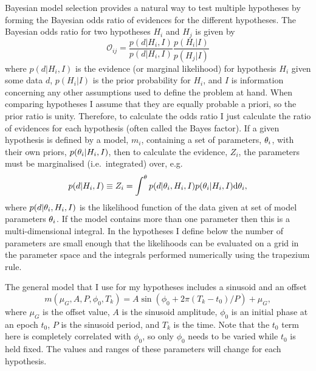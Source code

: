 \documentclass[comment]{epl2}
\begin{document}
Bayesian model selection provides a natural way to test multiple hypotheses by forming the Bayesian odds ratio of
evidences for the different hypotheses. The Bayesian odds ratio for two hypotheses $H_i$ and $H_j$ is given by
\begin{equation}
 \mathcal{O}_{ij} = \frac{p(d|H_i,I)}{p(d|H_i,I)}\frac{p(H_i|I)}{p(H_j|I)}
\end{equation}
where $p(d|H_i,I)$ is the evidence (or marginal likelihood) for hypothesis $H_i$ given some data $d$,
$p(H_i|I)$ is the prior probability for $H_i$, and $I$ is information concerning any other assumptions used to
define the problem at hand. When comparing hypotheses I assume that they are equally
probable a priori, so the prior ratio is unity. Therefore, to calculate the odds ratio I just calculate
the ratio of evidences for each hypothesis (often called the Bayes factor). If a given hypothesis is defined
by a model, $m_i$, containing a set of parameters, $\mathbf{\theta}_i$, with their own priors,
$p(\mathbf{\theta}_i|H_i,I)$, then to calculate the evidence, $Z_i$, the parameters must be marginalised (i.e.\ integrated)
over, e.g.
\begin{equation}\label{eq:evidence}
 p(d|H_i,I) \equiv Z_i = \int^{\mathbf{\theta}} p(d|\mathbf{\theta}_i,H_i,I) p(\mathbf{\theta}_i|H_i,I) {\rm d}\mathbf{\theta}_i,
\end{equation}
where $p(d|\mathbf{\theta}_i,H_i,I)$ is the likelihood function of the data given at set of model parameters $\mathbf{\theta}_i$. If
the model contains more than one parameter then this is a multi-dimensional integral. In the hypotheses I define
below the number of parameters are small enough that the likelihoods can be evaluated on a grid in the parameter
space and the integrals performed numerically using the trapezium rule.

The general model that I use for my hypotheses includes a sinusoid and an offset
\begin{equation}\label{eq:model}
 m(\mu_G, A, P, \phi_0, T_k) = A\sin{(\phi_0 + 2\pi (T_k-t_0)/P)} + \mu_G,
\end{equation}
where $\mu_G$ is the offset value, $A$ is the sinusoid amplitude, $\phi_0$ is an initial phase at an epoch $t_0$,
$P$ is the sinusoid period, and $T_k$ is the time. Note that the $t_0$ term here is completely correlated
with $\phi_0$, so only $\phi_0$ needs to be varied while $t_0$ is held fixed. The values and ranges of these 
parameters will change for each hypothesis.
\end{document}
